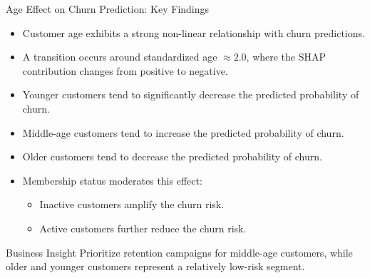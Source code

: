 \begin{frame}{Age Effect on Churn Prediction: Key Findings}

\footnotesize
\begin{itemize}
    \item Customer age exhibits a strong non-linear relationship with churn predictions.

    \item A transition occurs around standardized age $\approx 2.0$, where the SHAP contribution changes from positive to negative.

    \item Younger customers tend to significantly decrease the predicted probability of churn.

    \item Middle-age customers tend to increase the predicted probability of churn.

    \item Older customers tend to decrease the predicted probability of churn.

    \item Membership status moderates this effect:
    \begin{itemize}
        \item Inactive customers amplify the churn risk.
        \item Active customers further reduce the churn risk.
    \end{itemize}
\end{itemize}

\begin{block}{Business Insight}
Prioritize retention campaigns for middle-age customers, while older and younger customers represent a relatively low-risk segment.
\end{block}

\end{frame}

